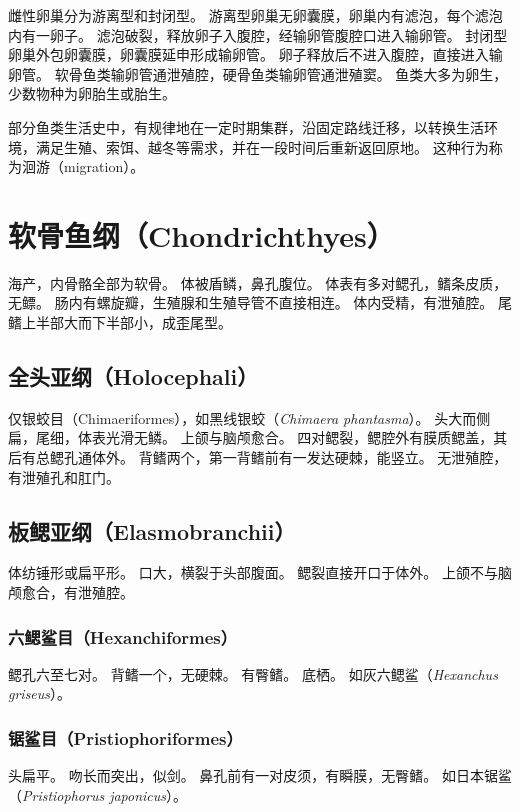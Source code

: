 \documentclass[11pt]{article}
\begin{document}
\newline

雌性卵巢分为游离型和封闭型。
游离型卵巢无卵囊膜，卵巢内有滤泡，每个滤泡内有一卵子。
滤泡破裂，释放卵子入腹腔，经输卵管腹腔口进入输卵管。
封闭型卵巢外包卵囊膜，卵囊膜延申形成输卵管。
卵子释放后不进入腹腔，直接进入输卵管。
软骨鱼类输卵管通泄殖腔，硬骨鱼类输卵管通泄殖窦。
鱼类大多为卵生，少数物种为卵胎生或胎生。

\newline

部分鱼类生活史中，有规律地在一定时期集群，沿固定路线迁移，以转换生活环境，满足生殖、索饵、越冬等需求，并在一段时间后重新返回原地。
这种行为称为洄游（migration）。
  
\section{软骨鱼纲（Chondrichthyes）}
海产，内骨骼全部为软骨。
体被盾鳞，鼻孔腹位。
体表有多对鳃孔，鳍条皮质，无鳔。
肠内有螺旋瓣，生殖腺和生殖导管不直接相连。
体内受精，有泄殖腔。
尾鳍上半部大而下半部小，成歪尾型。

\subsection{全头亚纲（Holocephali）}
仅银蛟目（Chimaeriformes），如黑线银蛟（\textit{Chimaera phantasma}）。
头大而侧扁，尾细，体表光滑无鳞。
上颌与脑颅愈合。
四对鳃裂，鳃腔外有膜质鳃盖，其后有总鳃孔通体外。
背鳍两个，第一背鳍前有一发达硬棘，能竖立。
无泄殖腔，有泄殖孔和肛门。

\subsection{板鳃亚纲（Elasmobranchii）}
体纺锤形或扁平形。
口大，横裂于头部腹面。
鳃裂直接开口于体外。
上颌不与脑颅愈合，有泄殖腔。

\subsubsection{六鳃鲨目（Hexanchiformes）}
鳃孔六至七对。
背鳍一个，无硬棘。
有臀鳍。
底栖。
如灰六鳃鲨（\textit{Hexanchus griseus}）。

\subsubsection{锯鲨目（Pristiophoriformes）}
头扁平。
吻长而突出，似剑。
鼻孔前有一对皮须，有瞬膜，无臀鳍。
如日本锯鲨（\textit{Pristiophorus japonicus}）。
\end{document}
